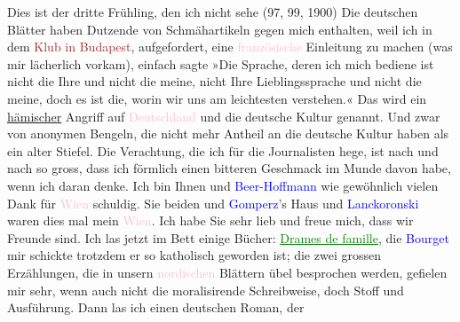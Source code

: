           \pstart
           Dies ist der dritte Frühling, den ich nicht sehe (97,
                        99, 1900)\pend
           \pstart
           Die deutschen Blätter haben Dutzende von Schmähartikeln gegen mich enthalten,
                    weil ich in dem \textcolor{brown}{Klub
                        in Budapest}{}, aufgefordert, eine \textcolor{pink}{französische}{}\ledrightnote{\textcolor{pink}{Frankreich}} Einleitung zu machen (was mir lächerlich vorkam),
                    einfach sagte »Die Sprache, deren ich mich bediene ist nicht die Ihre und nicht
                    die meine, nicht Ihre Lieblingssprache und nicht die meine, doch es ist die,
                    worin wir uns am leichtesten verstehen.« Das wird ein \uline{hämischer} Angriff auf \textcolor{pink}{Deutschland}{}\ledrightnote{\textcolor{pink}{Deutschland}}
                    und die deutsche Kultur genannt. Und zwar von anonymen Bengeln, die nicht mehr
                    Antheil an die deutsche Kultur haben als ein alter Stiefel. Die Verachtung, die ich für die Journalisten {\pb}hege, ist nach und nach so
                    gross, dass ich förmlich einen bitteren Geschmack im Munde davon habe, wenn ich
                    daran denke.\pend
           \pstart
           Ich bin Ihnen und \textcolor{blue}{Beer-Hoffmann}{}\ledrightnote{\textcolor{blue}{Richard Beer-Hofmann}} wie
                    gewöhnlich vielen Dank für \textcolor{pink}{Wien}{}\ledrightnote{\textcolor{pink}{Wien}}
               schuldig.\pend
           \pstart
           Sie beiden und \textcolor{blue}{Gomperz}{}\ledrightnote{\textcolor{blue}{Theodor Gomperz}}’s Haus und \textcolor{blue}{Lanckoronski}{}\ledrightnote{\textcolor{blue}{Karl Lanckoroński}} waren dies mal mein \textcolor{pink}{Wien}{}\ledrightnote{\textcolor{pink}{Wien}}. Ich habe Sie sehr lieb und freue mich,
                    dass wir Freunde sind.\pend
           \pstart
           Ich las jetzt im Bett einige Bücher: \textcolor{green}{\uline{Drames de famille}}{}\ledrightnote{\textcolor{green}{Familiendramen}}, die \textcolor{blue}{Bourget}{}\ledrightnote{\textcolor{blue}{Paul Bourget}} mir schickte trotzdem
                    er so katholisch geworden ist; die zwei grossen Erzählungen, die in unsern \textcolor{pink}{nordischen}{} Blättern übel
                    besprochen werden, gefielen mir sehr, wenn auch nicht die moralisirende
                    Schreibweise, doch Stoff und Ausführung. Dann las ich einen deutschen Roman, der
